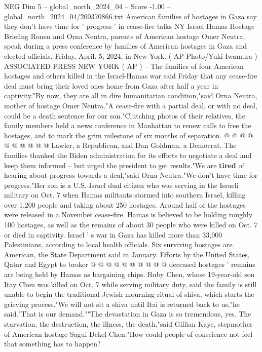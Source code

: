 \begin{textsample}{NEG Dim 5 – global\_north\_2024\_04 – Score -1.00 – global\_north\_2024\_04/200370866.txt}  \label{ex:f5_neg_192}
American families of hostages in Gaza say they don't have time for ' progress ' in cease-fire talks NY Israel Hamas Hostage Briefing Ronen and Orna Neutra, parents of American hostage Omer Neutra, speak during a press conference by families of American hostages in Gaza and elected officials, Friday, April. 5, 2024, in New York. ( AP Photo/Yuki Iwamura ) ASSOCIATED PRESS NEW YORK ( AP ) -- The families of four American hostages and others killed in the Israel-Hamas war said Friday that any cease-fire deal must bring their loved ones home from Gaza after half a year in captivity."By now, they are all in dire humanitarian condition,"said Orna Neutra, mother of hostage Omer Neutra."A cease-fire with a partial deal, or with no deal, could be a death sentence for our son."Clutching photos of their relatives, the family members held a news conference in Manhattan to renew calls to free the hostages, and to mark the grim milestone of six months of separation. @ @ @ @ @ @ @ @ @ @ Lawler, a Republican, and Dan Goldman, a Democrat.
The families thanked the Biden administration for its efforts to negotiate a deal and keep them informed -- but urged the president to get results."We are \textbf{tired} of hearing about progress towards a deal,"said Orna Neutra."We don't have time for progress."Her son is a U.S.-Israel dual citizen who was serving in the Israeli military on Oct. 7 when Hamas militants stormed into southern Israel, killing over 1,200 people and taking about 250 hostages.
Around half of the hostages were released in a November cease-fire.
Hamas is believed to be holding roughly 100 hostages, as well as the remains of about 30 people who were killed on Oct. 7 or died in captivity.
Israel ' s war in Gaza has killed more than 33,000 Palestinians, according to local health officials.
Six surviving hostages are American, the State Department said in January.
Efforts by the United States, Qatar and Egypt to broker @ @ @ @ @ @ @ @ @ @ deceased hostages ' remains are being held by Hamas as bargaining chips.
Ruby Chen, whose 19-year-old son Itay Chen was killed on Oct. 7 while serving military duty, said the family is still unable to begin the traditional Jewish mourning ritual of shiva, which starts the grieving process."We will not sit a shiva until Itai is returned back to us,"he said."That is our demand.""The devastation in Gaza is so tremendous, yes.
The starvation, the destruction, the illness, the death,"said Gillian Kaye, stepmother of American hostage Sagui Dekel-Chen."How could people of conscience not feel that something has to happen?

\end{textsample}
